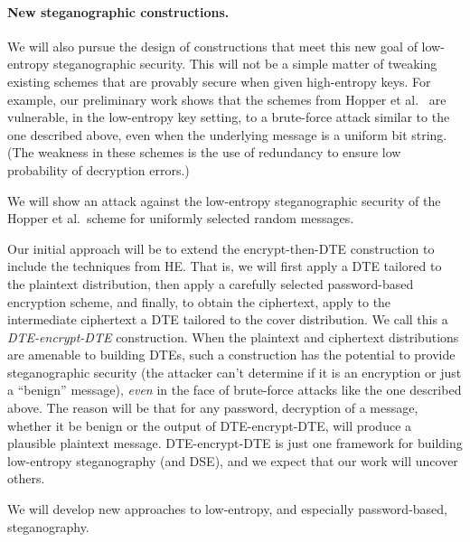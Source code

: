 \paragraph{New steganographic constructions.}
We will also pursue the design of constructions that meet
this new goal of low-entropy steganographic security.  This will not be a simple matter of tweaking existing
schemes that are provably secure when given high-entropy keys.
For example, our preliminary work shows that the schemes from Hopper et
al.~\cite{Hopper:Provable_Stego} are vulnerable, in the low-entropy
key setting, to a brute-force attack similar to
the one described above, even when the underlying message is 
a uniform bit string.  (The weakness in these schemes is the use of redundancy to ensure low
probability of decryption errors.) 

\begin{task}
\label{task:attack-hopper}
We will show an attack against the low-entropy steganographic security of the
Hopper et al.~scheme for uniformly selected random messages.
\end{task}

\noindent
Our initial approach will be to extend the encrypt-then-DTE construction to
include the techniques from HE.  That is, we will first apply a DTE tailored
to the plaintext distribution, then apply a carefully selected 
password-based encryption scheme, and finally, to obtain the ciphertext, apply to the intermediate ciphertext a DTE tailored to the cover
distribution. We call this a \textit{DTE-encrypt-DTE} construction.  When the
plaintext and ciphertext distributions are amenable to building DTEs,
such a construction has the potential to provide steganographic
security (the attacker can't determine if it is an encryption or just a ``benign''
message), \emph{even} in the face of 
brute-force attacks like the one described above. The reason will be that for any password,
decryption of a message, whether it be benign or the output of DTE-encrypt-DTE,
will produce a 
plausible plaintext message.   DTE-encrypt-DTE is just one framework for
building low-entropy steganography (and DSE), and we expect that our
work will uncover others.

\begin{task}
\label{task:pwstego-approaches}
We will develop new approaches to low-entropy, and especially
password-based, steganography.
\end{task}

%

